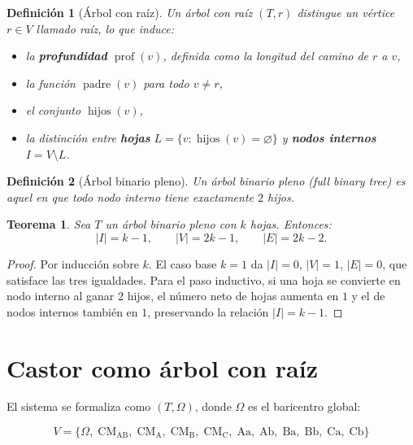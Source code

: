 \documentclass[a4paper]{article}
\newtheorem{teorema}{Teorema}
\newtheorem{definicion}{Definición}
\begin{document}
\begin{definicion}[Árbol con raíz]
Un árbol con raíz $(T, r)$ distingue un vértice $r \in V$ llamado
raíz, lo que induce:
\begin{itemize}
  \item la \textbf{profundidad} $\operatorname{prof}(v)$, definida como
        la longitud del camino de $r$ a $v$,
  \item la función $\operatorname{padre}(v)$ para todo $v \neq r$,
  \item el conjunto $\operatorname{hijos}(v)$,
  \item la distinción entre \textbf{hojas}
        $L = \{v : \operatorname{hijos}(v) = \varnothing\}$
        y \textbf{nodos internos} $I = V \setminus L$.
\end{itemize}
\end{definicion}

\begin{definicion}[Árbol binario pleno]
Un árbol binario pleno (\textit{full binary tree}) es aquel en que
todo nodo interno tiene exactamente $2$ hijos.
\end{definicion}

\begin{teorema}
Sea $T$ un árbol binario pleno con $k$ hojas. Entonces:
$$|I| = k - 1, \qquad |V| = 2k - 1, \qquad |E| = 2k - 2.$$
\end{teorema}

\begin{proof}
Por inducción sobre $k$. El caso base $k = 1$ da $|I| = 0$, $|V| = 1$,
$|E| = 0$, que satisface las tres igualdades. Para el paso inductivo,
si una hoja se convierte en nodo interno al ganar $2$ hijos, el número
neto de hojas aumenta en $1$ y el de nodos internos también en $1$,
preservando la relación $|I| = k - 1$.
\end{proof}

\section{Castor como árbol con raíz}

El sistema se formaliza como $(T, \Omega)$, donde $\Omega$ es el
baricentro global:

$$V = \{\Omega,\;\mathrm{CM_{AB}},\;\mathrm{CM_A},\;\mathrm{CM_B},\;
       \mathrm{CM_C},\;\mathrm{Aa},\;\mathrm{Ab},\;\mathrm{Ba},\;
       \mathrm{Bb},\;\mathrm{Ca},\;\mathrm{Cb}\}$$
\end{document}
